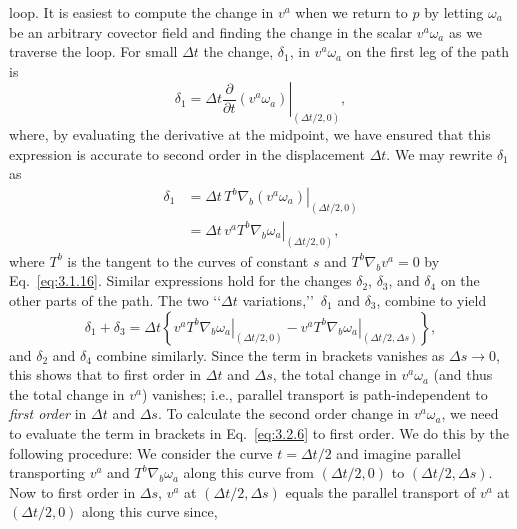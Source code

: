 

loop. It is easiest to compute the change in $v^a$ when we return to $p$ by letting $\omega_a$ be
an arbitrary covector field and finding the change in the scalar $v^a\omega_a$ as we traverse
the loop. For small $\Delta t$ the change, $\delta_1$, in $v^a\omega_a$ on the first leg of the path is
\begin{equation}
  \delta_1=\left.\Delta t\frac{\partial}{\partial t}(v^a\omega_a)\right|_{(\Delta t/2,0)},
  \tag{3.2.4}\label{eq:3.2.4}
\end{equation}
where, by evaluating the derivative at the midpoint, we have ensured that this
expression is accurate to second order in the displacement $\Delta t$. We may rewrite $\delta_1$ as
\begin{equation}
  \begin{aligned}
    \delta_1
    &=\left.\Delta t\,T^b\nabla_b(v^a\omega_a)\right|_{(\Delta t/2,0)}\\
    &=\left.\Delta t\,v^aT^b\nabla_b\omega_a\right|_{(\Delta t/2,0)},
  \end{aligned}
  \tag{3.2.5}\label{eq:3.2.5}
\end{equation}
where $T^b$ is the tangent to the curves of constant $s$ and $T^b\nabla_bv^a=0$ by
Eq.~\eqref{eq:3.1.16}. Similar expressions hold for the changes $\delta_2$, $\delta_3$, and
$\delta_4$ on the other parts of the path. The two \lq\lq $\Delta t$ variations,\rq\rq\ $\delta_1$ and
$\delta_3$, combine to yield
\begin{equation}
  \delta_1+\delta_3
  =\Delta t\left\{
  \left.v^aT^b\nabla_b\omega_a\right|_{(\Delta t/2,0)}
  -\left.v^aT^b\nabla_b\omega_a\right|_{(\Delta t/2,\Delta s)}
  \right\},
  \tag{3.2.6}\label{eq:3.2.6}
\end{equation}
and $\delta_2$ and $\delta_4$ combine similarly. Since the term in brackets vanishes as
$\Delta s\to0$, this shows that to first order in $\Delta t$ and $\Delta s$, the total change in $v^a\omega_a$
(and thus the total change in $v^a$) vanishes; i.e., parallel transport is path-independent
to \emph{first order} in $\Delta t$ and $\Delta s$. To calculate the second order change in $v^a\omega_a$, we need to evaluate the
term in brackets in Eq.~\eqref{eq:3.2.6} to first order. We do this by the following
procedure: We consider the curve $t=\Delta t/2$ and imagine parallel transporting $v^a$ and
$T^b\nabla_b\omega_a$ along this curve from $(\Delta t/2,0)$ to $(\Delta t/2,\Delta s)$. Now to first order in
$\Delta s$, $v^a$ at $(\Delta t/2,\Delta s)$ equals the parallel transport of $v^a$ at $(\Delta t/2,0)$ along this curve since,
